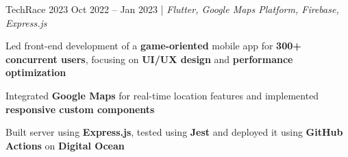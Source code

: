 \resumeSubheadings
{TechRace 2023 }
{Oct 2022 -- Jan 2023}
{}{}{| \textit{Flutter, Google Maps Platform, Firebase, Express.js}}
\resumeItemListStart
\item Led front-end development of a \textbf{game-oriented} mobile app for \textbf{300+ concurrent users}, focusing on \textbf{UI/UX design} and \textbf{performance optimization}
\item Integrated \textbf{Google Maps} for real-time location features and implemented \textbf{responsive custom components}
\item Built server using \textbf{Express.js}, tested using \textbf{Jest} and deployed it using \textbf{GitHub Actions} on \textbf{Digital Ocean}
\resumeItemListEnd